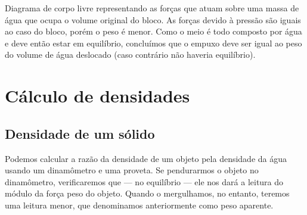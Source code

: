 \begin{marginfigure}
\centering
{}
\caption{Diagrama de corpo livre representando as forças que atuam sobre uma massa de água que ocupa o volume original do bloco. As forças devido à pressão são iguais ao caso do bloco, porém o peso é menor. Como o meio é todo composto por água e deve então estar em equilíbrio, concluímos que o empuxo deve ser igual ao peso do volume de água deslocado (caso contrário não haveria equilíbrio).}
\label{Fig:BlAguaBeckerDiagrama}
\end{marginfigure}
\section{Cálculo de densidades}

\subsection{Densidade de um sólido}

Podemos calcular a razão da densidade de um objeto pela densidade da água usando um dinamômetro e uma proveta. Se pendurarmos o objeto no dinamômetro, verificaremos que --- no equilíbrio --- ele nos dará a leitura do módulo da força peso do objeto. Quando o mergulhamos, no entanto, teremos uma leitura menor, que denominamos anteriormente como peso aparente.

